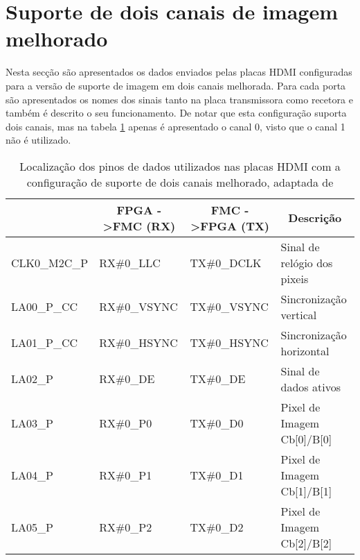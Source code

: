 \section{Suporte de dois canais de imagem melhorado} \label{ap1:HDMIconfigMelhorado}

Nesta secção são apresentados os dados enviados pelas placas HDMI configuradas para a versão de suporte de imagem em dois canais melhorada. Para cada porta são apresentados os nomes dos sinais tanto na placa transmissora como recetora e também é descrito o seu funcionamento. De notar que esta configuração suporta dois canais, mas na tabela \ref{table:HDMI1canal_melhorado} apenas é apresentado o canal 0, visto que o canal 1 não é utilizado.
\\


\begin{longtable}[h!]
	{@{}llll@{}}
	\caption{Localização dos pinos de dados utilizados nas placas HDMI com a configuração de suporte de dois canais melhorado, adaptada de \cite{R013}}
	\label{table:HDMI1canal_melhorado}
	\hline
	\centering
	\multicolumn{1}{c}{\textbf{PORTA}} & \multicolumn{1}{c}{\textbf{FPGA -\textgreater FMC (RX)}} & \multicolumn{1}{c}{\textbf{FMC -\textgreater FPGA (TX)}} & \multicolumn{1}{c}{\textbf{Descrição}} \\ \hline \endhead
	CLK0\_M2C\_P & RX\#0\_LLC          				& TX\#0\_DCLK                          & Sinal de relógio dos pixeis 			\\ 
	LA00\_P\_CC  & RX\#0\_VSYNC         			  & TX\#0\_VSYNC                         & Sincronização vertical         		\\ 
	LA01\_P\_CC  & RX\#0\_HSYNC         		  & TX\#0\_HSYNC                         & Sincronização horizontal       		\\ 
	LA02\_P      & RX\#0\_DE            				   & TX\#0\_DE                            & Sinal de dados ativos          		\\
	LA03\_P      & RX\#0\_P0            				   & TX\#0\_D0                            & Pixel de Imagem Cb{[}0{]}/B{[}0{]}   \\
	LA04\_P      & RX\#0\_P1            		      & TX\#0\_D1                            & Pixel de Imagem Cb{[}1{]}/B{[}1{]}   \\ 
	LA05\_P      & RX\#0\_P2            			      & TX\#0\_D2                            & Pixel de Imagem Cb{[}2{]}/B{[}2{]}   \\ 

\end{longtable}
